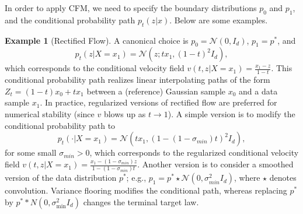 \documentclass[a4paper,11pt]{article}
\theoremstyle{plain}
\theoremstyle{definition}
\newtheorem{exampleinner}[theoreminner]{Example}
\newenvironment{example}[1][]
  {\begin{mdframed}[style=examplestyle]\begin{exampleinner}[#1]}
  {\end{exampleinner}\end{mdframed}}
\begin{document}
In order to apply CFM, we need to specify the boundary distributions $p_0$ and $p_1$, and the conditional probability path $p_t(z|x)$. Below are some examples.

\begin{example}[Rectified Flow] \label{ex_RF}
    A canonical choice \cite{liu2022flow} is $p_0 = \mathcal{N}(0, I_d)$, $p_1 = p^*$, and 
    \begin{equation} \label{eq_probpath_RF}
         p_t(z | X = x_1) = \mathcal{N}(z; t x_1, (1-t)^2 I_d),
    \end{equation}
    which corresponds to the conditional velocity field $v(t, z| X=x_1) = \frac{x_1 - z}{1-t}$. This conditional probability path realizes linear interpolating paths of the form $Z_t = (1-t) x_0 + t x_1$ between a (reference) Gaussian sample $x_0$ and a data sample $x_1$. In practice,  regularized versions of rectified flow are preferred for numerical stability  (since $v$ blows up as $t \to 1$). A simple version is to modify the conditional probability path to $$p_t(\cdot | X = x_1) = \mathcal{N}(t x_1, (1-(1-\sigma_{min})t)^2 I_d),$$ for some small $\sigma_{min} > 0$, which corresponds to the regularized conditional velocity field $v(t, z| X=x_1) = \frac{x_1 - (1-\sigma_{min})z}{1-(1-\sigma_{min})t}$. Another version is to  consider a smoothed version of the data distribution $p^*$; e.g., $p_1 = p^* \star \mathcal{N}(0, \sigma_{min}^2 I_d)$, where $\star$ denotes convolution. Variance flooring modifies the conditional path, whereas replacing \(p^\ast\) by \(p^\ast\ast N(0,\sigma_{\min}^2I_d)\) changes the terminal target law.
\end{example}
\end{document}
